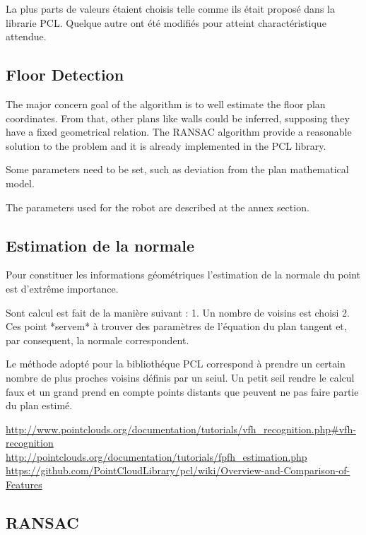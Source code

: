 La plus parts de valeurs étaient choisis telle comme ils était proposé dans la librarie PCL. Quelque autre ont été modifiés pour atteint charactéristique attendue.

\subsection { Floor Detection } 

The major concern goal of the algorithm is to well estimate the floor plan coordinates. From that, other plans like walls could be inferred, supposing they have a fixed geometrical relation. The RANSAC algorithm provide a reasonable solution to the problem and it is already implemented in the PCL library.

Some parameters need to be set, such as deviation from the plan mathematical model.

The parameters used for the robot are described at the annex section.


\subsection{Estimation de la normale}

Pour constituer les informations géométriques l'estimation de la normale du point est d'extrême importance. 

Sont calcul est fait de la manière suivant :
1. Un nombre de voisins est choisi 
2. Ces point *servem* à trouver des paramètres de l'équation du plan tangent et, par consequent, la normale correspondent.

Le méthode adopté pour la bibliothéque PCL correspond à prendre un certain nombre de plus proches voisins définis par un seiul. Un petit seil rendre le calcul faux et un grand prend en compte points distants que peuvent ne pas faire partie du plan estimé.

\url{http://www.pointclouds.org/documentation/tutorials/vfh_recognition.php#vfh-recognition} \\

\url{http://pointclouds.org/documentation/tutorials/fpfh_estimation.php} \\

\url{https://github.com/PointCloudLibrary/pcl/wiki/Overview-and-Comparison-of-Features} \\

\subsection { RANSAC } 

